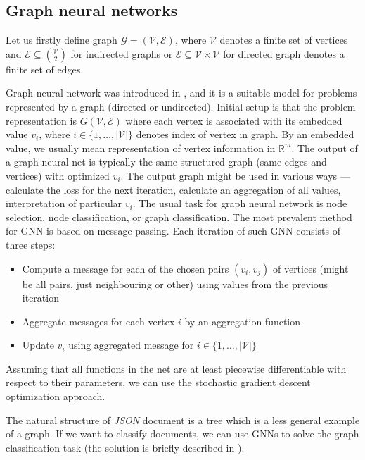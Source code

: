\subsection{Graph neural networks}
Let us firstly define graph $\mathcal{G}=(\mathcal{V},\mathcal{E})$, where $\mathcal{V}$ denotes a finite set of vertices and $\mathcal{E}\subseteq\binom{\mathcal{V}}{2}$ for indirected graphs or $\mathcal{E}\subseteq\mathcal{V}\times\mathcal{V}$ for directed graph denotes a finite set of edges. 

Graph neural network was introduced in \cite{Scarselli2009}, and it is a suitable model for problems represented by a graph (directed or undirected). Initial setup is that the problem representation is $G(\mathcal{V},\mathcal{E})$ where each vertex is associated with its embedded value $v_i$, where $i\in\{1,\dots,|\mathcal{V}|\}$ denotes index of vertex in graph. By an embedded value, we usually mean representation of vertex information in $\mathbb{R}^m$. The output of a graph neural net is typically the same structured graph (same edges and vertices) with optimized $v_i$. The output graph might be used in various ways --- calculate the loss for the next iteration, calculate an aggregation of all values, interpretation of particular $v_i$. The usual task for graph neural network is node selection, node classification, or graph classification. The most prevalent method for GNN is based on message passing. Each iteration of such GNN consists of three steps:
\begin{itemize}
    \itemsep0em
    \item Compute a message for each of the chosen pairs $(v_i,v_j)$ of vertices (might be all pairs, just neighbouring or other) using values from the previous iteration
    \item Aggregate messages for each vertex $i$ by an aggregation function
    \item Update $v_i$ using aggregated message for $i\in\{1,\dots,|\mathcal{V}|\}$
\end{itemize}

Assuming that all functions in the net are at least piecewise differentiable with respect to their parameters, we can use the stochastic gradient descent optimization approach.

The natural structure of \emph{JSON} document is a tree which is a less general example of a graph. If we want to classify documents, we can use GNNs to solve the graph classification task (the solution is briefly described in \cite{Pevny2020}).


